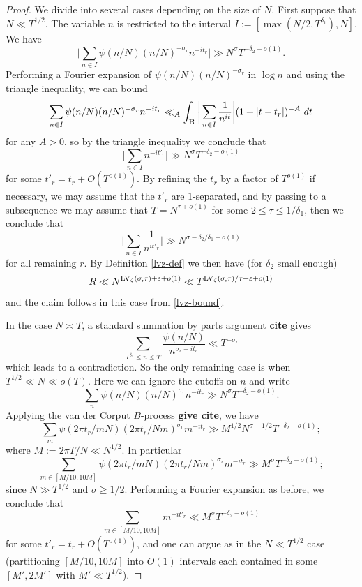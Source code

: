 \begin{proof}
We divide into several cases depending on the size of $N$.  First suppose that $N \ll T^{1/2}$.  The variable $n$ is restricted to the interval $I := [\max(N/2, T^{\delta_1}), N]$.  We have
$$ \bigg|\sum_{n \in I} \psi(n/N) (n/N)^{-\sigma_r} n^{-it_r} \bigg| \gg N^\sigma T^{-\delta_2 - o(1)}.$$
Performing a Fourier expansion of $\psi(n/N) (n/N)^{-\sigma_r}$ in $\log n$ and using the triangle inequality, we can bound
$$ \sum_{n \in I} \psi(n/N) (n/N)^{-\sigma_r} n^{-it_r}  \ll_A \int_{\mathbf{R}} \bigg| \sum_{n \in I} \frac{1}{n^{it}} \bigg| (1+|t-t_r|)^{-A}\ dt$$
for any $A>0$, so by the triangle inequality we conclude that
$$ \bigg|\sum_{n \in I} n^{-it'_r} \bigg| \gg N^\sigma T^{-\delta_2 - o(1)}$$
for some $t'_r = t_r + O(T^{o(1)})$.  By refining the $t_r$ by a factor of $T^{o(1)}$ if necessary, we may assume that the $t'_r$ are $1$-separated, and by passing to a subsequence we may assume that $T = N^{\tau+o(1)}$ for some $2 \leq \tau \leq 1/\delta_1$, then
we conclude that
$$ \bigg| \sum_{n \in I} \frac{1}{n^{it'_r}} \bigg| \gg N^{\sigma-\delta_2/\delta_1+o(1)}$$
for all remaining $r$.  By Definition \ref{lvz-def} we then have (for $\delta_2$ small enough)
$$ R \ll N^{\mathrm{LV}_\zeta(\sigma,\tau) + \varepsilon + o(1)} \ll T^{\mathrm{LV}_\zeta(\sigma,\tau)/\tau + \varepsilon + o(1)}$$
and the claim follows in this case from \eqref{lvz-bound}.

In the case $N \asymp T$, a standard summation by parts argument {\bf cite} gives
$$ \sum_{T^{\delta_1} \leq n \leq T} \frac{\psi(n/N)}{n^{\sigma_r+it_r}} \ll T^{-\sigma_r}$$
which leads to a contradiction.  So the only remaining case is when $T^{1/2} \ll N \ll o(T)$.  Here we can ignore the cutoffs on $n$ and write
$$ \sum_{n} \psi(n/N) (n/N)^{\sigma_r} n^{-it_r} \gg N^{\sigma} T^{-\delta_2-o(1)}.$$
Applying the van der Corput $B$-process {\bf give cite}, we have
$$ \sum_{m} \psi(2\pi t_r/mN) (2\pi t_r/Nm)^{\sigma_r} m^{-it_r} \gg M^{1/2} N^{\sigma-1/2} T^{-\delta_2-o(1)};$$
where $M := 2\pi T/N \ll N^{1/2}$.  In particular
$$ \sum_{m \in [M/10, 10 M]} \psi(2\pi t_r/mN) (2\pi t_r/Nm)^{\sigma_r} m^{-it_r} \gg M^{\sigma} T^{-\delta_2-o(1)};$$
since $N \gg T^{1/2}$ and $\sigma \geq 1/2$.  Performing a Fourier expansion as before, we conclude that
$$ \sum_{m \in [M/10, 10 M]} m^{-it'_r} \ll M^{\sigma} T^{-\delta_2-o(1)}$$
for some $t'_r = t_r + O(T^{o(1)})$, and one can argue as in the $N \ll T^{1/2}$ case (partitioning $[M/10, 10M]$ into $O(1)$ intervals each contained in some $[M',2M']$ with $M' \ll T^{1/2}$).


\end{proof}
